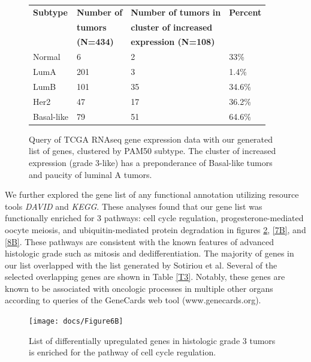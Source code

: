 \documentclass[a4paper,10pt]{article}
\begin{document}
 \begin{figure}
\begin{tabular}{| l | l | l | l | }
    \hline
\textbf{Subtype} & \textbf{Number of} & \textbf{Number of tumors in } & \textbf{Percent}\\  
 &   \textbf{tumors}  & \textbf{cluster of increased} & \\
 &  \textbf{ (N=434)} & \textbf{expression (N=108)} & \\
\hline
Normal & 6 & 2 & 33\% \\ \hline 
 LumA & 201 & 3 & 1.4\% \\ \hline 
 LumB & 101 & 35 & 34.6\% \\ \hline 
 Her2 & 47 & 17 & 36.2\% \\ \hline 
 Basal-like & 79 & 51 & 64.6\% \\ \hline 
\end{tabular}
\caption{Query of TCGA RNAseq gene expression data with our generated list of genes,
 clustered by PAM50 subtype.  The cluster of increased expression (grade 3-like) has a preponderance 
of Basal-like tumors and paucity of luminal A tumors.}\label{T2}
\end{figure}

We further explored the gene list of any functional annotation utilizing resource tools 
\emph{DAVID} and \emph{KEGG}\cite{Huang1}\cite{Kanehisa1}\cite{Kanehisa2}\cite{Ogata1}.  These analyses found that our gene list 
was functionally enriched for 3 pathways: cell cycle regulation, progesterone-mediated 
oocyte meiosis, and ubiquitin-mediated protein degradation in figures \ref{6B}, \ref{7B}, and \ref{8B}. 
 These pathways are consistent with the known features of advanced histologic 
grade such as mitosis and dedifferentiation.  The majority of genes in our list
 overlapped with the list generated by Sotiriou et al. Several of the selected 
overlapping genes are shown in Table \ref{T3}.  Notably, these genes are known to 
be associated with oncologic processes in multiple other organs according to 
queries of the GeneCards web tool (www.genecards.org).  


 \begin{figure}
\centering
\texttt{[image: docs/Figure6B]}
\caption{List of differentially upregulated genes in histologic 
grade 3 tumors is enriched for the pathway of cell cycle regulation.}\label{6B}
\end{figure}
\end{document}
